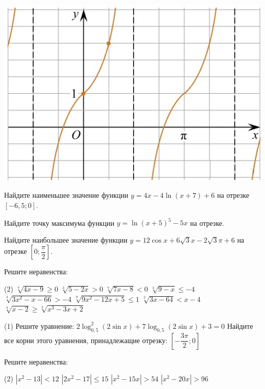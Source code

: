 \begin{homework}[number=3]
\begin{listofex}
\begin{minipage}[t]{\picwidth}
			\includegraphics[align=t, width=\linewidth]{../pics/MECGERM6H3-2.jpg}
		\end{minipage}
		\item Найдите наименьшее значение функции \( y=4x-4 \ln(x+7)+6 \) на отрезке \( [-6,5;0] \). %
		\item Найдите точку максимума функции \( y=\ln(x+5)^5-5x \) на отрезке. %
		\item Найдите наибольшее значение функции \( y=12\cos x + 6\sqrt{3} x - 2 \sqrt{3} \pi + 6 \) на отрезке \( \left[ 0; \dfrac{ \pi }{ 2 } \right]  \).
	\end{listofex}
\end{homework}

\begin{class}[number=7]
	\begin{listofex}
		\item Решите неравенства: %
		\begin{tasks}(2)
			\task \( \sqrt[ 7 ]{ 4x-9 } \ge 0 \) %
			\task \( \sqrt[ 3 ]{ 5-2x } >0 \) %
			\task \( \sqrt[ 7]{ 7x-8 } < 0 \) %
			\task \( \sqrt[ 3 ]{ 9-x } \le -4 \) %
			\task \( \sqrt[ 3 ]{ 3x^2-x-66 } > -4 \) %
			\task \( \sqrt[ 9 ]{ 9x^2-12x+5 } \le 1 \) %
			\task \( \sqrt[ 3 ]{ 3x-64 } < x-4 \) %
			\task \( \sqrt[ 3 ]{ x-2 } \ge \sqrt[ 3 ]{ x^3-3x+2 } \) %
		\end{tasks}
		\item %
		\begin{tasks}(1)
			\task Решите уравнение: \( 2\log_{0,5}^2 (2\sin x) + 7 \log_{0,5} (2\sin x) + 3 = 0 \)
			\task Найдите все корни этого уравнения, принадлежащие отрезку: \( \left[ -\dfrac{3\pi}{2};0 \right] \)
		\end{tasks}
		
		\item Решите неравенства: %
		\begin{tasks}(2)
			\task \( |x^2-13| < 12 \)
			\task \( |2x^2-17| \le 15 \)
			\task \( |x^2-15x| > 54 \)
			\task \( |x^2-20x|>96 \)
		\end{tasks}
	\end{listofex}
\end{class}

